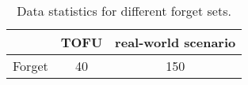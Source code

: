 \begin{table}[h]
    \centering
    \begin{tabular}{lcc}
        \hline
        & \textbf{TOFU} & \textbf{real-world scenario} \\
        \hline
        Forget      & 40   & 150 \\
        \hline
    \end{tabular}
    \caption{Data statistics for different forget sets.}
    \label{tab:data-statistics-forget}
\end{table}
